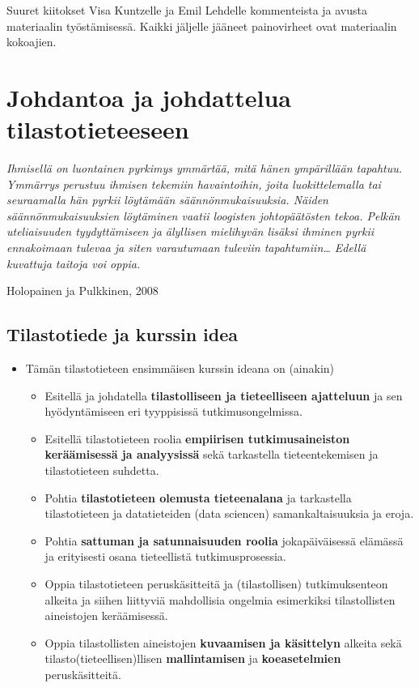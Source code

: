\documentclass[
]{book}
\providecommand{\tightlist}{%
  \setlength{\itemsep}{0pt}\setlength{\parskip}{0pt}}
\begin{document}
Suuret kiitokset Visa Kuntzelle ja Emil Lehdelle kommenteista ja avusta materiaalin työstämisessä. Kaikki jäljelle jääneet painovirheet ovat materiaalin kokoajien.

\hypertarget{johdantoa-ja-johdattelua-tilastotieteeseen}{%
\chapter{Johdantoa ja johdattelua tilastotieteeseen}\label{johdantoa-ja-johdattelua-tilastotieteeseen}}

\emph{Ihmisellä on luontainen pyrkimys ymmärtää, mitä hänen ympärillään tapahtuu. Ymmärrys perustuu ihmisen tekemiin havaintoihin, joita luokittelemalla tai seuraamalla hän pyrkii löytämään säännönmukaisuuksia. Näiden säännönmukaisuuksien löytäminen vaatii loogisten johtopäätösten tekoa. Pelkän uteliaisuuden tyydyttämiseen ja älyllisen mielihyvän lisäksi ihminen pyrkii ennakoimaan tulevaa ja siten varautumaan tuleviin tapahtumiin\ldots{} Edellä kuvattuja taitoja voi oppia.}

Holopainen ja Pulkkinen, 2008

\hypertarget{tilastotiede-ja-kurssin-idea}{%
\section{Tilastotiede ja kurssin idea}\label{tilastotiede-ja-kurssin-idea}}

\begin{itemize}
\tightlist
\item
  Tämän tilastotieteen ensimmäisen kurssin ideana on (ainakin)

  \begin{itemize}
  \tightlist
  \item
    Esitellä ja johdatella \textbf{tilastolliseen ja tieteelliseen ajatteluun} ja sen hyödyntämiseen eri tyyppisissä tutkimusongelmissa.
  \item
    Esitellä tilastotieteen roolia \textbf{empiirisen tutkimusaineiston keräämisessä ja analyysissä} sekä tarkastella tieteentekemisen ja tilastotieteen suhdetta.
  \item
    Pohtia \textbf{tilastotieteen olemusta tieteenalana} ja tarkastella tilastotieteen ja datatieteiden (data sciencen) samankaltaisuuksia ja eroja.
  \item
    Pohtia \textbf{sattuman ja satunnaisuuden roolia} jokapäiväisessä elämässä ja erityisesti osana tieteellistä tutkimusprosessia.
  \item
    Oppia tilastotieteen peruskäsitteitä ja (tilastollisen) tutkimuksenteon alkeita ja siihen liittyviä mahdollisia ongelmia esimerkiksi tilastollisten aineistojen keräämisessä.
  \item
    Oppia tilastollisten aineistojen \textbf{kuvaamisen ja käsittelyn} alkeita sekä tilasto(tieteellisen)llisen \textbf{mallintamisen} ja \textbf{koeasetelmien} peruskäsitteitä.
  \end{itemize}
\end{itemize}
\end{document}
